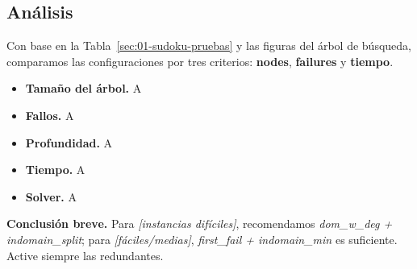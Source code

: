 
\subsection{Análisis}\label{sec:01-sudoku-analisis}
Con base en la Tabla~\ref{sec:01-sudoku-pruebas} y las figuras del árbol de búsqueda, comparamos las configuraciones por tres criterios: \textbf{nodes}, \textbf{failures} y \textbf{tiempo}.

\begin{itemize}
  \item \textbf{Tamaño del árbol.} A
  \item \textbf{Fallos.} A
  \item \textbf{Profundidad.} A
  \item \textbf{Tiempo.} A
  \item \textbf{Solver.} A
\end{itemize}

\noindent \textbf{Conclusión breve.} Para \textit{[instancias difíciles]}, recomendamos \textit{dom\_w\_deg + indomain\_split}; para \textit{[fáciles/medias]}, \textit{first\_fail + indomain\_min} es suficiente. Active siempre las redundantes.
